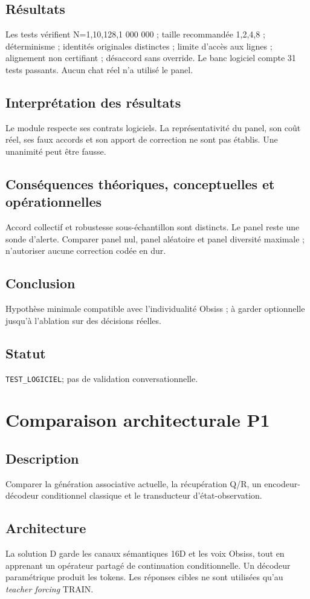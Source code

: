 \documentclass[11pt,a4paper]{report}
\begin{document}
\subsection{Résultats}
Les tests vérifient N=1,10,128,1 000 000 ; taille recommandée 1,2,4,8 ; déterminisme ; identités originales distinctes ; limite d'accès aux lignes ; alignement non certifiant ; désaccord sans override. Le banc logiciel compte 31 tests passants. Aucun chat réel n'a utilisé le panel.
\subsection{Interprétation des résultats}
Le module respecte ses contrats logiciels. La représentativité du panel, son coût réel, ses faux accords et son apport de correction ne sont pas établis. Une unanimité peut être fausse.
\subsection{Conséquences théoriques, conceptuelles et opérationnelles}
Accord collectif et robustesse sous-échantillon sont distincts. Le panel reste une sonde d'alerte. Comparer panel nul, panel aléatoire et panel diversité maximale ; n'autoriser aucune correction codée en dur.
\subsection{Conclusion}
Hypothèse minimale compatible avec l'individualité Obsiss ; à garder optionnelle jusqu'à l'ablation sur des décisions réelles.
\subsection{Statut}
\texttt{TEST\_LOGICIEL}; pas de validation conversationnelle.

\section{Comparaison architecturale P1}
\subsection{Description}
Comparer la génération associative actuelle, la récupération Q/R, un encodeur-décodeur conditionnel classique et le transducteur d'état-observation.
\subsection{Architecture}
La solution D garde les canaux sémantiques 16D et les voix Obsiss, tout en apprenant un opérateur partagé de continuation conditionnelle. Un décodeur paramétrique produit les tokens. Les réponses cibles ne sont utilisées qu'au \textit{teacher forcing} TRAIN.
\end{document}

